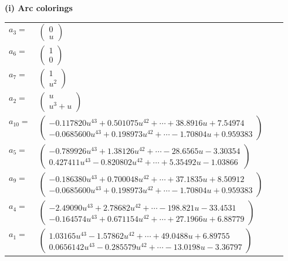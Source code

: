 \documentclass[1p]{elsarticle_modified}
\theoremstyle{definition}
\begin{document}
\flushleft \textbf{(i) Arc colorings}\\
\begin{tabular}{m{7pt} m{180pt} m{7pt} m{180pt} }
\flushright $a_{3}=$&$\begin{pmatrix}0\\u\end{pmatrix}$ \\
\flushright $a_{6}=$&$\begin{pmatrix}1\\0\end{pmatrix}$ \\
\flushright $a_{7}=$&$\begin{pmatrix}1\\u^2\end{pmatrix}$ \\
\flushright $a_{2}=$&$\begin{pmatrix}u\\u^3+u\end{pmatrix}$ \\
\flushright $a_{10}=$&$\begin{pmatrix}-0.117820 u^{43}+0.501075 u^{42}+\cdots+38.8916 u+7.54974\\-0.0685600 u^{43}+0.198973 u^{42}+\cdots-1.70804 u+0.959383\end{pmatrix}$ \\
\flushright $a_{5}=$&$\begin{pmatrix}-0.789926 u^{43}+1.38126 u^{42}+\cdots-28.6565 u-3.30354\\0.427411 u^{43}-0.820802 u^{42}+\cdots+5.35492 u-1.03866\end{pmatrix}$ \\
\flushright $a_{9}=$&$\begin{pmatrix}-0.186380 u^{43}+0.700048 u^{42}+\cdots+37.1835 u+8.50912\\-0.0685600 u^{43}+0.198973 u^{42}+\cdots-1.70804 u+0.959383\end{pmatrix}$ \\
\flushright $a_{4}=$&$\begin{pmatrix}-2.49090 u^{43}+2.78682 u^{42}+\cdots-198.821 u-33.4531\\-0.164574 u^{43}+0.671154 u^{42}+\cdots+27.1966 u+6.88779\end{pmatrix}$ \\
\flushright $a_{1}=$&$\begin{pmatrix}1.03165 u^{43}-1.57862 u^{42}+\cdots+49.0488 u+6.89755\\0.0656142 u^{43}-0.285579 u^{42}+\cdots-13.0198 u-3.36797\end{pmatrix}$ \\

\end{tabular}
\end{document}

